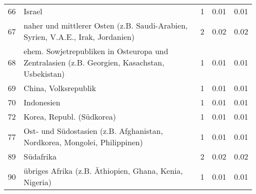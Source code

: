 \begin{longtable}{lXrrr}
        66 & \multicolumn{1}{X}{Israel} & %
          \num{1} &
          \num[round-mode=places,round-precision=2]{0.01} &
          \num[round-mode=places,round-precision=2]{0.01} \\

        67 & \multicolumn{1}{X}{naher und mittlerer Osten (z.B. Saudi-Arabien, Syrien, V.A.E., Irak, Jordanien)} & %
          \num{2} &
          \num[round-mode=places,round-precision=2]{0.02} &
          \num[round-mode=places,round-precision=2]{0.02} \\

        68 & \multicolumn{1}{X}{ehem. Sowjetrepubliken in Osteuropa und Zentralasien (z.B. Georgien, Kasachstan, Usbekistan)} & %
          \num{1} &
          \num[round-mode=places,round-precision=2]{0.01} &
          \num[round-mode=places,round-precision=2]{0.01} \\

        69 & \multicolumn{1}{X}{China, Volksrepublik} & %
          \num{1} &
          \num[round-mode=places,round-precision=2]{0.01} &
          \num[round-mode=places,round-precision=2]{0.01} \\

        70 & \multicolumn{1}{X}{Indonesien} & %
          \num{1} &
          \num[round-mode=places,round-precision=2]{0.01} &
          \num[round-mode=places,round-precision=2]{0.01} \\

        72 & \multicolumn{1}{X}{Korea, Republ. (Südkorea)} & %
          \num{1} &
          \num[round-mode=places,round-precision=2]{0.01} &
          \num[round-mode=places,round-precision=2]{0.01} \\

        77 & \multicolumn{1}{X}{Ost- und Südostasien (z.B. Afghanistan, Nordkorea, Mongolei, Philippinen)} & %
          \num{1} &
          \num[round-mode=places,round-precision=2]{0.01} &
          \num[round-mode=places,round-precision=2]{0.01} \\

        89 & \multicolumn{1}{X}{Südafrika} & %
          \num{2} &
          \num[round-mode=places,round-precision=2]{0.02} &
          \num[round-mode=places,round-precision=2]{0.02} \\

        90 & \multicolumn{1}{X}{übriges Afrika (z.B. Äthiopien, Ghana, Kenia, Nigeria)} & %
          \num{1} &
          \num[round-mode=places,round-precision=2]{0.01} &
          \num[round-mode=places,round-precision=2]{0.01} \\


\end{longtable}

